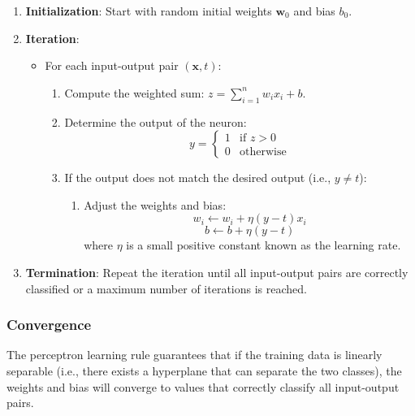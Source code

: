 \documentclass[english]{article}
\begin{document}
\begin{enumerate}
    \item \textbf{Initialization}: Start with random initial weights $\mathbf{w}_0$ and bias $b_0$.
    
    \item \textbf{Iteration}:
        \begin{itemize}
            \item For each input-output pair $(\mathbf{x}, t)$:
                \begin{enumerate}
                    \item Compute the weighted sum: \( z = \sum_{i=1}^{n} w_i x_i + b \).
                    \item Determine the output of the neuron:
                        \[
                        y = 
                        \begin{cases}
                            1 & \text{if } z > 0 \\
                            0 & \text{otherwise}
                        \end{cases}
                        \]
                    \item If the output does not match the desired output (i.e., $y \neq t$):
                        \begin{enumerate}
                            \item Adjust the weights and bias:
                                \[
                                w_i \leftarrow w_i + \eta (y-t) x_i
                                \]
                                \[
                                b \leftarrow b + \eta (y-t)
                                \]
                            where $\eta$ is a small positive constant known as the learning rate.
                        \end{enumerate}
                \end{enumerate}
        \end{itemize}
    
    \item \textbf{Termination}: Repeat the iteration until all input-output pairs are correctly classified or a maximum number of iterations is reached.
\end{enumerate}
\subsubsection{Convergence}

The perceptron learning rule guarantees that if the training data is linearly separable (i.e., there exists a hyperplane that can separate the two classes), the weights and bias will converge to values that correctly classify all input-output pairs.
\end{document}
